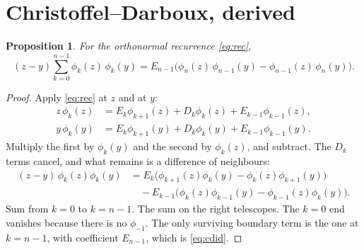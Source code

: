 \documentclass[11pt,a4paper]{article}
\newtheorem{proposition}{Proposition}[section]
\numberwithin{equation}{section}
\begin{document}
\section{Christoffel--Darboux, derived}
\label{sec:cd}

\begin{proposition}
\label{prop:cd}
For the orthonormal recurrence \eqref{eq:rec},
\begin{equation}
  (z-y)\sum_{k=0}^{n-1}\phi_k(z)\,\phi_k(y)
  = E_{n-1}\bigl(\phi_n(z)\,\phi_{n-1}(y)-\phi_{n-1}(z)\,\phi_n(y)\bigr).
  \label{eq:cdid}
\end{equation}
\end{proposition}

\begin{proof}
Apply \eqref{eq:rec} at $z$ and at $y$:
\begin{align*}
  z\,\phi_k(z) &= E_k\phi_{k+1}(z)+D_k\phi_k(z)+E_{k-1}\phi_{k-1}(z),\\
  y\,\phi_k(y) &= E_k\phi_{k+1}(y)+D_k\phi_k(y)+E_{k-1}\phi_{k-1}(y).
\end{align*}
Multiply the first by $\phi_k(y)$ and the second by $\phi_k(z)$, and subtract.
The $D_k$ terms cancel, and what remains is a difference of neighbours:
\begin{align*}
  (z-y)\,\phi_k(z)\phi_k(y)
  &= E_k\bigl(\phi_{k+1}(z)\phi_k(y)-\phi_k(z)\phi_{k+1}(y)\bigr)\\
  &\quad - E_{k-1}\bigl(\phi_k(z)\phi_{k-1}(y)-\phi_{k-1}(z)\phi_k(y)\bigr).
\end{align*}
Sum from $k=0$ to $k=n-1$. The sum on the right telescopes. The $k=0$ end vanishes
because there is no $\phi_{-1}$. The only surviving boundary term is the one at
$k=n-1$, with coefficient $E_{n-1}$, which is \eqref{eq:cdid}.
\end{proof}
\end{document}
